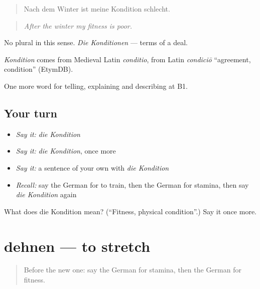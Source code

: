\begin{quote}
Nach dem Winter ist meine Kondition schlecht.
\end{quote}

\begin{quote}
\emph{After the winter my fitness is poor.}
\end{quote}

No plural in this sense. \emph{Die Konditionen} — terms of a deal.

\begin{cousinweb}
\emph{Kondition} comes from Medieval Latin \emph{conditio}, from Latin \emph{condiciō} \textquotedblleft{}agreement, condition\textquotedblright{} (EtymDB).
\end{cousinweb}

\begin{grammarlens}[title={What you've built}]
One more word for telling, explaining and describing at B1.
\end{grammarlens}

\subsection*{Your turn}
\begin{itemize}
\raggedright
  \item \emph{Say it:} \emph{die Kondition}
  \item \emph{Say it:} \emph{die Kondition}, once more
  \item \emph{Say it:} a sentence of your own with \emph{die Kondition}
  \item \emph{Recall:} say the German for to train, then the German for stamina, then say \emph{die Kondition} again
\end{itemize}

\begin{tcolorbox}[breakable,colback=teal!4,colframe=teal!35!black,title={Before you move on}]
What does die Kondition mean? (\textquotedblleft{}Fitness, physical condition\textquotedblright{}.) Say it once more.
\end{tcolorbox}
\section[dehnen]{dehnen — to stretch}

\label{lesson:GE-C505-dehnen}



\begin{quote}
Before the new one: say the German for stamina, then the German for fitness.
\end{quote}

